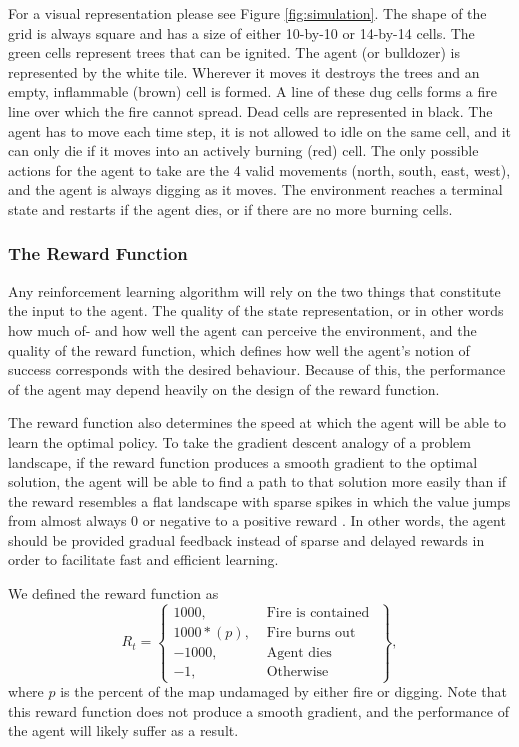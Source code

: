 For a visual representation please see Figure \ref{fig:simulation}. The shape of the grid is always square and has a size of either 10-by-10 or 14-by-14 cells. The green cells represent trees that can be ignited. The agent (or bulldozer) is represented by the white tile. Wherever it moves it destroys the trees and an empty, inflammable (brown) cell is formed. A line of these dug cells forms a fire line over which the fire cannot spread. Dead cells are represented in black. The agent has to move each time step, it is not allowed to idle on the same cell, and it can only die if it moves into an actively burning (red) cell. The only possible actions for the agent to take are the 4 valid movements (north, south, east, west), and the agent is always digging as it moves. The environment reaches a terminal state and restarts if the agent dies, or if there are no more burning cells.

\subsubsection{The Reward Function}\label{sec:reward_function}
Any reinforcement learning algorithm will rely on the two things that constitute the input to the agent. The quality of the state representation, or in other words how much of- and how well the agent can perceive the environment, and the quality of the reward function, which defines how well the agent's notion of success corresponds with the desired behaviour. Because of this, the performance of the agent may depend heavily on the design of the reward function.

The reward function also determines the speed at which the agent will be able to learn the optimal policy. To take the gradient descent analogy of a problem landscape, if the reward function produces a smooth gradient to the optimal solution, the agent will be able to find a path to that solution more easily than if the reward resembles a flat landscape with sparse spikes in which the value jumps from almost always 0 or negative to a positive reward \citep{sutton_barto_2018}. In other words, the agent should be provided gradual feedback instead of sparse and delayed rewards in order to facilitate fast and efficient learning. 

We defined the reward function as
\begin{equation}\label{eq:reward_function}
    R_t = \left\{\begin{array}{lr}
        1000, & \text{ Fire is contained }\\
        1000 * (p), & \text{ Fire burns out }\\
        -1000, & \text{ Agent dies }\\
        -1, & \text{ Otherwise }

        \end{array}\right\},
\end{equation}
where $p$ is the percent of the map undamaged by either fire or digging. Note that this reward function does not produce a smooth gradient, and the performance of the agent will likely suffer as a result.

